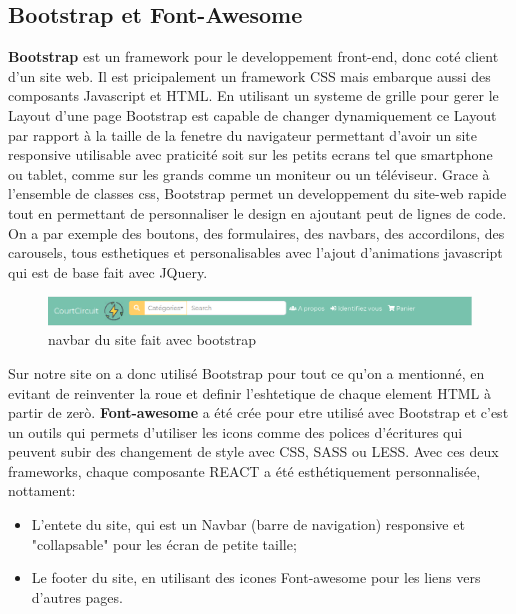 \documentclass[a4paper,12pt]{report}
\theoremstyle{break}
\theoremstyle{break}
\theoremstyle{break}
\theoremstyle{break}
\theoremstyle{definition}
\theoremstyle{remark}
\begin{document}
\subsection{Bootstrap et Font-Awesome}
\textbf{Bootstrap} est un framework pour le developpement front-end, donc coté client d'un site web.
Il est pricipalement un framework CSS mais embarque aussi des composants Javascript et HTML.
En utilisant un systeme de grille pour gerer le Layout d'une page Bootstrap est capable de changer dynamiquement
ce Layout par rapport à la taille de la fenetre du navigateur permettant d'avoir un site responsive utilisable
avec praticité soit sur les petits ecrans tel que smartphone ou tablet, comme sur les grands comme un moniteur ou un téléviseur.
Grace à l'ensemble de classes css, Bootstrap permet un developpement du site-web rapide tout en permettant de personnaliser le design
en ajoutant peut de lignes de code. On a par exemple des boutons, des formulaires, des navbars,
des accordilons, des carousels, tous esthetiques et personalisables avec l'ajout d'animations javascript qui est de base fait avec
JQuery.
\begin{figure}[!ht]
  \centering
  \includegraphics[scale=0.4]{images/bootstrap.png}
  \caption{navbar du site fait avec bootstrap}
  \label{fig:modele_EA}
\end{figure}
Sur notre site on a donc utilisé Bootstrap pour tout ce qu'on a mentionné, en evitant de reinventer la roue et definir
l'eshtetique de chaque element HTML à partir de zerò.
\textbf{Font-awesome} a été crée pour etre utilisé avec Bootstrap et c'est un outils qui permets d'utiliser les icons comme des polices d'écritures
qui peuvent subir des changement de style avec CSS, SASS ou LESS.
Avec ces deux frameworks, chaque composante REACT a été esthétiquement personnalisée, nottament:
\begin{itemize}
  \item L'entete du site, qui est un Navbar (barre de navigation) responsive et "collapsable" pour les écran de petite taille;
  \item Le footer du site, en utilisant des icones Font-awesome pour les liens vers d'autres pages.
\end{itemize}
\end{document}
